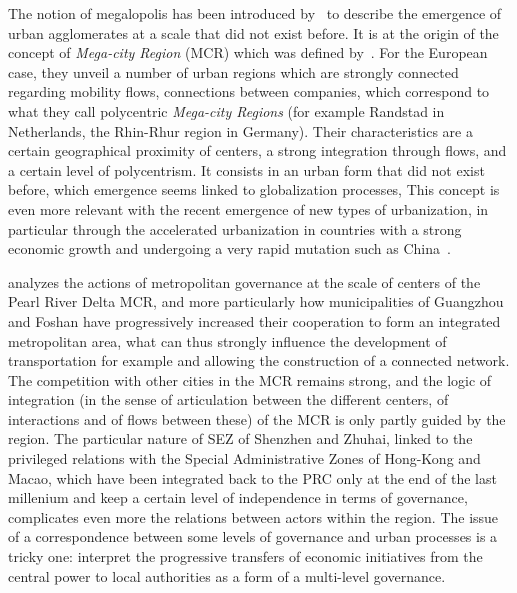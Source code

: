 The notion of megalopolis has been introduced by~\cite{gottmann1961megalopolis} to describe the emergence of urban agglomerates at a scale that did not exist before. It is at the origin of the concept of \emph{Mega-city Region} (MCR) which was defined by~\cite{hall2006polycentric}. For the European case, they unveil a number of urban regions which are strongly connected regarding mobility flows, connections between companies, which correspond to what they call polycentric \emph{Mega-city Regions} (for example Randstad in Netherlands, the Rhin-Rhur region in Germany). Their characteristics are a certain geographical proximity of centers, a strong integration through flows, and a certain level of polycentrism. It consists in an urban form that did not exist before, which emergence seems linked to globalization processes,  \cite{lenechet2017peupler}  This concept is even more relevant with the recent emergence of new types of urbanization, in particular through the accelerated urbanization in countries with a strong economic growth and undergoing a very rapid mutation such as China~\citep{swerts2015megacities}.


\cite{Ye2014200} analyzes the actions of metropolitan governance at the scale of centers of the Pearl River Delta MCR, and more particularly how municipalities of Guangzhou and Foshan have progressively increased their cooperation to form an integrated metropolitan area, what can thus strongly influence the development of transportation for example and allowing the construction of a connected network.  The competition with other cities in the MCR remains strong, and the logic of integration (in the sense of articulation between the different centers, of interactions and of flows between these) of the MCR is only partly guided by the region. The particular nature of SEZ of Shenzhen and Zhuhai, linked to the privileged relations with the Special Administrative Zones of Hong-Kong and Macao, which have been integrated back to the PRC only at the end of the last millenium and keep a certain level of independence in terms of governance, complicates even more the relations between actors within the region. The issue of a correspondence between some levels of governance and urban processes is a tricky one: \cite{liao2017ouverture} interpret the progressive transfers of economic initiatives from the central power to local authorities as a form of a multi-level governance.


